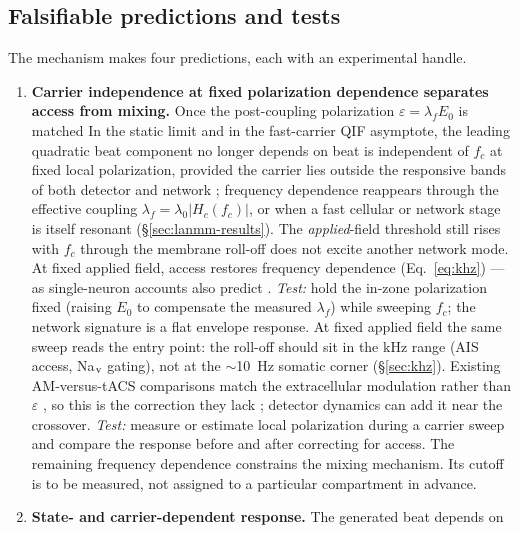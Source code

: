 \documentclass[11pt,a4paper]{article}
\providecommand{\DIFaddtex}[1]{{\protect\color{blue} \sf #1}} %
\providecommand{\DIFdeltex}[1]{{\protect\color{red} \scriptsize #1}} %
\providecommand{\DIFaddbegin}{} %
\providecommand{\DIFaddend}{} %
\providecommand{\DIFdelbegin}{} %
\providecommand{\DIFdelend}{} %
\providecommand{\DIFadd}[1]{\texorpdfstring{\DIFaddtex{#1}}{#1}} %
\providecommand{\DIFdel}[1]{\texorpdfstring{\DIFdeltex{#1}}{}} %
\begin{document}
\subsection{Falsifiable predictions and tests}\label{sec:predictions}
The mechanism makes four predictions, each with an experimental handle.
\begin{enumerate}[leftmargin=*]
\item \textbf{Carrier \DIFdelbegin \DIFdel{independence at fixed polarization}\DIFdelend \DIFaddbegin \DIFadd{dependence separates access from mixing}\DIFaddend .} \DIFdelbegin \DIFdel{Once the post-coupling
polarization $\varepsilon=\lambda_f E_0$ is matched}\DIFdelend \DIFaddbegin \DIFadd{In the static limit
and in the fast-carrier QIF asymptote}\DIFaddend , the leading \DIFdelbegin \DIFdel{quadratic beat component
no longer depends on }\DIFdelend \DIFaddbegin \DIFadd{beat is independent of }\DIFaddend $f_c$ \DIFaddbegin \DIFadd{at
fixed local polarization}\DIFaddend , provided the carrier \DIFdelbegin \DIFdel{lies outside the responsive bands of both
detector and network ; frequency dependence
reappears through the effective coupling
$\lambda_f=\lambda_0|H_c(f_c)|$, or when a fast cellular or network stage is itself resonant
(\S\ref{sec:lanmm-results}). The \emph{applied}-field threshold still rises with $f_c$
through the membrane roll-off }\DIFdelend \DIFaddbegin \DIFadd{does not excite another network mode.
At fixed applied field, access restores frequency dependence
}\DIFaddend (Eq.~\eqref{eq:khz})\DIFdelbegin \DIFdel{---as single-neuron accounts also
predict \cite{opancar2025,mirzakhalili2020}.
\emph{Test:} hold the in-zone
polarization fixed (raising $E_0$ to compensate the measured $\lambda_f$) while
sweeping $f_c$; the network signature is a flat envelope response. At fixed applied
field the same sweep reads the entry point: the roll-off should sit in the kHz range (AIS
access, Na$_{\rm v}$ gating), not at the $\sim$10~Hz somatic corner (\S\ref{sec:khz}). Existing
AM-versus-tACS comparisons match the extracellular modulation rather than $\varepsilon$
\cite{vieira2024}, so this is the correction they lack}\DIFdelend \DIFaddbegin \DIFadd{; detector dynamics can add it near the crossover.
\emph{Test:} measure or estimate local polarization during a carrier sweep and
compare the response before and after correcting for access}\DIFaddend . \DIFaddbegin \DIFadd{The remaining
frequency dependence constrains the mixing mechanism. Its cutoff is to be
measured, not assigned to a particular compartment in advance.
}\DIFaddend \item \textbf{State- and carrier-dependent response.} The generated beat depends on

\end{enumerate}
\end{document}
